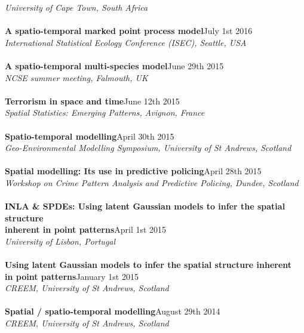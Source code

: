 \documentclass[10pt,letter]{article}
\begin{document}
 {\sl University of Cape Town, South Africa}\\
\hdashrule[0.5ex]{4cm}{1pt}{1pt}\\
{\textbf{A spatio-temporal marked point process model}}\hfill July 1st 2016\\
 {\sl International Statistical Ecology Conference (ISEC), Seattle, USA}\\
  \hdashrule[0.5ex]{4cm}{1pt}{1pt}\\
 {\textbf{A spatio-temporal multi-species model}}\hfill June 29th 2015\\
 {\sl NCSE summer meeting, Falmouth, UK}\\
 \hdashrule[0.5ex]{4cm}{1pt}{1pt}\\
{\textbf{Terrorism in space and time}}\hfill June 12th 2015\\
 {\sl Spatial Statistics: Emerging Patterns, Avignon, France}\\
 \hdashrule[0.5ex]{4cm}{1pt}{1pt}\\
 {\textbf{Spatio-temporal modelling}}\hfill April 30th 2015\\
 {\sl Geo-Environmental Modelling Symposium, University of St Andrews, Scotland}\\
 \hdashrule[0.5ex]{4cm}{1pt}{1pt}\\
{\textbf{Spatial modelling: Its use in predictive policing}}\hfill April 28th 2015\\
{\sl Workshop on Crime Pattern Analysis and Predictive Policing, Dundee, Scotland}\\
\hdashrule[0.5ex]{4cm}{1pt}{1pt}\\
{\textbf{INLA \& SPDEs: Using latent Gaussian models to infer the spatial structure \\
inherent in point patterns}}\hfill April 1st 2015\\
 {\sl University of Lisbon, Portugal}\\
 \hdashrule[0.5ex]{4cm}{1pt}{1pt}\\
 {\textbf{Using latent Gaussian models to infer the spatial
structure inherent \\in point patterns}}\hfill January 1st 2015\\
 {\sl CREEM, University of St Andrews, Scotland}\\
 \hdashrule[0.5ex]{4cm}{1pt}{1pt}\\
 {\textbf{Spatial / spatio-temporal modelling}}\hfill August 29th 2014\\
 {\sl CREEM, University of St Andrews, Scotland}\\
\end{document}
